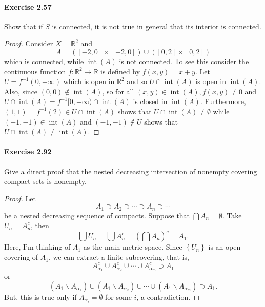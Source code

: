 \documentclass{article}
\begin{document}
\paragraph{Exercise 2.57} Show that if $S$ is connected, it is not true in general that its interior is connected.
\begin{proof}
    Consider $X=\mathbb{R}^2$ and
$$
A=([-2,0] \times[-2,0]) \cup([0,2] \times[0,2])
$$
which is connected, while $\operatorname{int}(A)$ is not connected.
To see this consider the continuous function $f: \mathbb{R}^2 \rightarrow \mathbb{R}$ is defined by $f(x, y)=x+y$. Let $U=f^{-1}(0,+\infty)$ which is open in $\mathbb{R}^2$ and so $U \cap \operatorname{int}(A)$ is open in $\operatorname{int}(A)$. Also, since $(0,0) \notin \operatorname{int}(A)$, so for all $(x, y) \in \operatorname{int}(A), f(x, y) \neq 0$ and $U \cap \operatorname{int}(A)=f^{-1}[0,+\infty) \cap \operatorname{int}(A)$ is closed in $\operatorname{int}(A)$. Furthermore, $(1,1)=f^{-1}(2) \in U \cap \operatorname{int}(A)$ shows that $U \cap \operatorname{int}(A) \neq \emptyset$ while $(-1,-1) \in \operatorname{int}(A)$ and $(-1,-1) \notin U$ shows that $U \cap \operatorname{int}(A) \neq \operatorname{int}(A)$.
\end{proof}


\paragraph{Exercise 2.92} Give a direct proof that the nested decreasing intersection of nonempty covering compact sets is nonempty.
\begin{proof}
    Let
$$
A_1 \supset A_2 \supset \cdots \supset A_n \supset \cdots
$$
be a nested decreasing sequence of compacts. Suppose that $\bigcap A_n=\emptyset$. Take $U_n=A_n^c$, then
$$
\bigcup U_n=\bigcup A_n^c=\left(\bigcap A_n\right)^c=A_1 .
$$
Here, I'm thinking of $A_1$ as the main metric space. Since $\left\{U_n\right\}$ is an open covering of $A_1$, we can extract a finite subcovering, that is,
$$
A_{\alpha_1}^c \cup A_{\alpha_2}^c \cup \cdots \cup A_{\alpha_m}^c \supset A_1
$$
or
$$
\left(A_1 \backslash A_{\alpha_1}\right) \cup\left(A_1 \backslash A_{\alpha_2}\right) \cup \cdots \cup\left(A_1 \backslash A_{\alpha_m}\right) \supset A_1 .
$$
But, this is true only if $A_{\alpha_i}=\emptyset$ for some $i$, a contradiction.
\end{proof}
\end{document}
